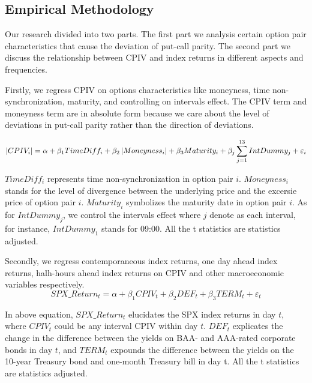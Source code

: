 \subsection{Empirical Methodology}
Our research divided into two parts. The first part we analysis certain option pair characteristics that cause the deviation of put-call parity. The second part we discuss the relationship between CPIV and index returns in different aspects and frequencies. 

Firstly, we regress CPIV on options characteristics like moneyness, time non-synchronization, maturity, and controlling on intervals effect. The CPIV term and moneyness term are in absolute form because we care about the level of deviations in put-call parity rather than the direction of deviations. 

 \begin{equation}\label{eq:char}
 \footnotesize
\left | CPIV _{i} \right| = \alpha  + \beta _{1}TimeDiff_{i} + \beta _{2}\left |Moneyness_{i} \right | + \beta _{3}Maturity_{i} +  \beta _{j} \sum_{j=1}^{13}IntDummy_{j} +\varepsilon _{i}
 \end{equation}

$TimeDiff_{i}$ represents time non-synchronization in option pair $i$. $Moneyness_{i}$ stands for the level of divergence between the underlying price and the excersie price of option pair $i$. $Maturity_{i}$ symbolizes the maturity date in option pair $i$. As for $IntDummy_{j} $, we control the intervals effect where $j$ denote as each interval, for instance, $IntDummy_{1}$ stands for 09:00. All the t statistics are \citeauthor{newey1986simple} statistics adjusted. 

Secondly, we regress contemporaneous index returns, one day ahead index returns, halh-hours ahead index returns on CPIV and other macroeconomic variables respectively. 
 \begin{equation}  \label{eq:contem}
SPX\_Return_{t} = \alpha + \beta _{1}CPIV_{t} + \beta _{2}DEF_{t} + \beta _{3}TERM_{t} + \varepsilon _{t}
 \end{equation}

In above equation, $SPX\_Return_{t}$ elucidates the SPX index returns in day $t$, where $CPIV_{t}$ could be any interval CPIV within day $t$. $DEF_{t}$ explicates the change in the difference between the yields on BAA- and AAA-rated corporate bonds in day $t$, and $TERM_{t}$ expounds the difference between the yields on the 10-year Treasury bond and one-month Treasury bill in day t. All the t statistics are \citeauthor{newey1986simple} statistics adjusted. 

